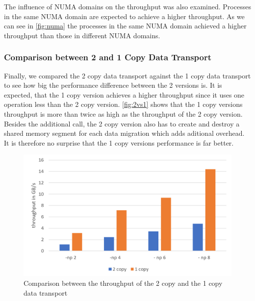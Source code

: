 The influence of NUMA domains on the throughput was also examined.
Processes in the same NUMA domain are expected to achieve a higher throughput.
As we can see in \autoref{fig:numa} the processes in the same NUMA domain achieved a higher throughput than those in different NUMA domains.

\subsubsection{Comparison between 2 and 1 Copy Data Transport}

Finally, we compared the 2 copy data transport against the 1 copy data transport to see how big the performance difference between the 2 versions is.
It is expected, that the 1 copy version achieves a higher throughput since it uses one  operation less than the 2 copy version.
\autoref{fig:2vs1} shows that the 1 copy versions throughput is more than twice as high as the throughput of the 2 copy version.
Besides the additional  call, the 2 copy version also has to create and destroy a shared memory segment for each data migration which adds aditional overhead.
It is therefore no surprise that the 1 copy versions performance is far better. 

\begin{figure}[h]
	\centering
	\includegraphics[width=0.70\columnwidth]{figures/2vs1.png}
	\caption{Comparison between the throughput of the 2 copy and the 1 copy data transport}
	\label{fig:2vs1}
\end{figure}